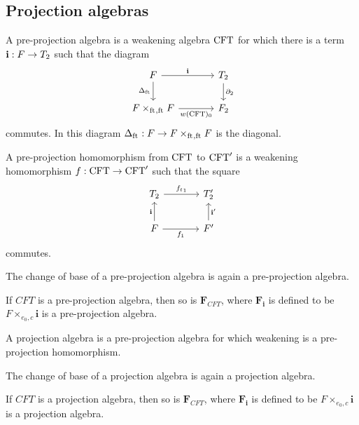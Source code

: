 \subsection{Projection algebras}
\begin{defn}
A pre-projection algebra is a weakening algebra $\mathrm{CFT}$ for which there is a term
$\mathbf{i}:F\to T_2$ such that the diagram
\begin{equation*}
\begin{tikzcd}[column sep=large]
\stesysf \ar{r}{\mathbf{i}} \ar{d}[swap]{\Delta_{\eft}} & \stesyst_2 \ar{d}{\ebd[2]}\\
\pullback{\stesysf}{\stesysf}{\eft}{\eft} \ar{r}[swap]{w(\stesys)_0} & \stesysf_2
\end{tikzcd}
\end{equation*}
commutes. In this diagram $\Delta_{\eft}:\stesysf\to \pullback{\stesysf}{\stesysf}{\eft}{\eft}$ is the diagonal.
\end{defn}

\begin{defn}
A pre-projection homomorphism from $\mathrm{CFT}$ to $\mathrm{CFT}'$ is a weakening homomorphism
$f:\mathrm{CFT}\to \mathrm{CFT}'$ such that the square
\begin{equation*}
\begin{tikzcd}[column sep=large]
\stesyst_2
  \ar{r}{{f_t}_1}
  &
\stesyst_2'
  \\
\stesysf \ar{r}[swap]{f_1}
  \ar{u}{\mathbf{i}}
  &
\stesysf'
  \ar{u}[swap]{\mathbf{i}'}
\end{tikzcd}
\end{equation*}
commutes.
\end{defn}

\begin{lem}
The change of base of a pre-projection algebra is again a pre-projection algebra.
\end{lem}

\begin{lem}
If $CFT$ is a pre-projection algebra, then so is $\mathbf{F}_{CFT}$, where
$\mathbf{F}_{\mathbf{i}}$ is defined to be $F\times_{e_0,c}\mathbf{i}$ is
a pre-projection algebra.
\end{lem}

\begin{defn}
A projection algebra is a pre-projection algebra for which weakening is a
pre-projection homomorphism.
\end{defn}

\begin{cor}
The change of base of a projection algebra is again a projection algebra.
\end{cor}

\begin{cor}
If $CFT$ is a projection algebra, then so is $\mathbf{F}_{CFT}$, where
$\mathbf{F}_{\mathbf{i}}$ is defined to be $F\times_{e_0,c}\mathbf{i}$ is
a projection algebra.
\end{cor}
